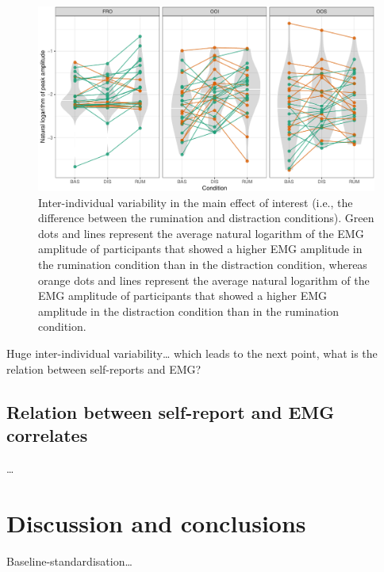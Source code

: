 \documentclass[
  english,
  man,floatsintext]{apa6}
\begin{document}
\begin{figure}[!htb]

{\centering \includegraphics[width=1\linewidth]{reanalysis_files/figure-latex/everyone-1} 

}

\caption{Inter-individual variability in the main effect of interest (i.e., the difference between the rumination and distraction conditions). Green dots and lines represent the average natural logarithm of the EMG amplitude of participants that showed a higher EMG amplitude in the rumination condition than in the distraction condition, whereas orange dots and lines represent the average natural logarithm of the EMG amplitude of participants that showed a higher EMG amplitude in the distraction condition than in the rumination condition.}\label{fig:everyone}
\end{figure}

Huge inter-individual variability\ldots{} which leads to the next point, what is the relation between self-reports and EMG?

\hypertarget{relation-between-self-report-and-emg-correlates}{%
\subsection{Relation between self-report and EMG correlates}\label{relation-between-self-report-and-emg-correlates}}

\ldots{}

\hypertarget{discussion-and-conclusions}{%
\section{Discussion and conclusions}\label{discussion-and-conclusions}}

Baseline-standardisation\ldots{}
\end{document}
